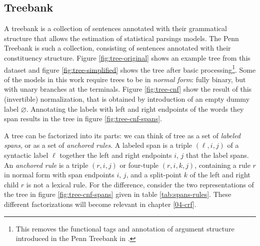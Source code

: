   \subsection{Treebank}
    A treebank is a collection of sentences annotated with their grammatical structure that allows the estimation of statistical parsings models. The Penn Treebank \citep{marcus1993penn} is such a collection, consisting of sentences annotated with their constituency structure. Figure \ref{fig:tree-original} shows an example tree from this dataset and figure \ref{fig:tree-simplified} shows the tree after basic processing\footnote{This removes the functional tags and annotation of argument structure introduced in the Penn Treebank in \citep{marcus1994annotating}.}. Some of the models in this work require trees to be in \textit{normal form}: fully binary, but with unary branches at the terminals. Figure \ref{fig:tree-cnf} show the result of this (invertible) normalization, that is obtained by introduction of an empty dummy label $\varnothing$. Annotating the labels with left and right endpoints of the words they span results in the tree in figure \ref{fig:tree-cnf-spans}.

    A tree can be factorized into its parts: we can think of tree as a set of \textit{labeled spans}, or as a set of \textit{anchored rules}. A labeled span is a triple $(\ell, i, j)$ of a syntactic label $\ell$ together the left and right endpoints $i$, $j$ that the label spans. An \textit{anchored rule} is a triple $(r, i, j)$ or four-tuple $(r, i, k, j)$, containing a rule $r$ in normal form with span endpoints $i$, $j$, and a split-point $k$ of the left and right child $r$ is not a lexical rule. For the difference, consider the two representations of the tree in figure \ref{fig:tree-cnf-spans} given in table \ref{tab:spans-rules}. These different factorizations will become relevant in chapter \ref{04-crf}.

